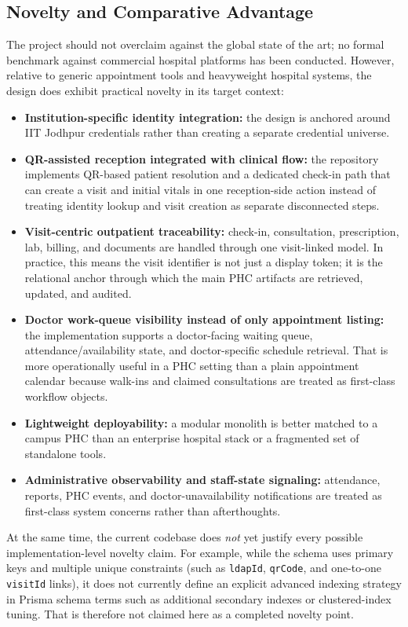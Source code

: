 \documentclass[conference]{IEEEtran}
\begin{document}
\subsection{Novelty and Comparative Advantage}
The project should not overclaim against the global state of the art; no formal benchmark against commercial hospital platforms has been conducted. However, relative to generic appointment tools and heavyweight hospital systems, the design does exhibit practical novelty in its target context:
\begin{itemize}
    \item \textbf{Institution-specific identity integration:} the design is anchored around IIT Jodhpur credentials rather than creating a separate credential universe.
    \item \textbf{QR-assisted reception integrated with clinical flow:} the repository implements QR-based patient resolution and a dedicated check-in path that can create a visit and initial vitals in one reception-side action instead of treating identity lookup and visit creation as separate disconnected steps.
    \item \textbf{Visit-centric outpatient traceability:} check-in, consultation, prescription, lab, billing, and documents are handled through one visit-linked model. In practice, this means the visit identifier is not just a display token; it is the relational anchor through which the main PHC artifacts are retrieved, updated, and audited.
    \item \textbf{Doctor work-queue visibility instead of only appointment listing:} the implementation supports a doctor-facing waiting queue, attendance/availability state, and doctor-specific schedule retrieval. That is more operationally useful in a PHC setting than a plain appointment calendar because walk-ins and claimed consultations are treated as first-class workflow objects.
    \item \textbf{Lightweight deployability:} a modular monolith is better matched to a campus PHC than an enterprise hospital stack or a fragmented set of standalone tools.
    \item \textbf{Administrative observability and staff-state signaling:} attendance, reports, PHC events, and doctor-unavailability notifications are treated as first-class system concerns rather than afterthoughts.
\end{itemize}

At the same time, the current codebase does \emph{not} yet justify every possible implementation-level novelty claim. For example, while the schema uses primary keys and multiple unique constraints (such as \texttt{ldapId}, \texttt{qrCode}, and one-to-one \texttt{visitId} links), it does not currently define an explicit advanced indexing strategy in Prisma schema terms such as additional secondary indexes or clustered-index tuning. That is therefore not claimed here as a completed novelty point.
\end{document}
